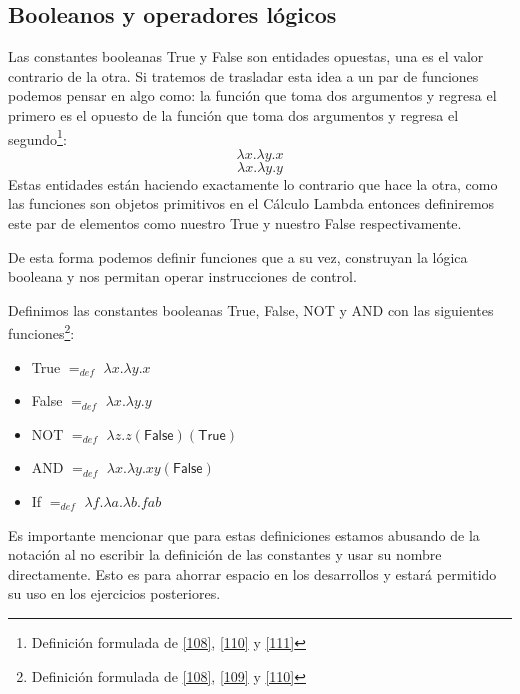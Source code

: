     \subsection{Booleanos y operadores lógicos}
    Las constantes booleanas \textsf{True} y \textsf{False} son entidades opuestas, una es el valor contrario de la otra. Si tratemos de trasladar esta idea a un par de funciones podemos pensar en algo como:
    la función que toma dos argumentos y regresa el primero es el opuesto de la función que toma dos argumentos y regresa el segundo\footnote{Definición formulada de \hyperlink{108}{[108]},  \hyperlink{110}{[110]} y  \hyperlink{111}{[111]}}:
    \[
        \lambda x.\lambda y.x
    \]
    \[
        \lambda x.\lambda y.y
    \]
    Estas entidades están haciendo exactamente lo contrario que hace la otra, como las funciones son objetos primitivos en el Cálculo Lambda entonces definiremos este par de elementos como nuestro \textsf{True} y nuestro \textsf{False} respectivamente.

    De esta forma podemos definir funciones que a su vez, construyan la lógica booleana y nos permitan operar instrucciones de control.
    \begin{definition} Definimos las constantes booleanas \textsf{True}, \textsf{False}, \textsf{NOT} y \textsf{AND} con las siguientes funciones\footnote{Definición formulada de \hyperlink{108}{[108]},  \hyperlink{109}{[109]} y  \hyperlink{110}{[110]}}:\\

        \begin{itemize}
            \item \textsf{True}  $=_{def}$  $\lambda x.\lambda y.x$ 
            \item \textsf{False}  $=_{def}$   $\lambda x.\lambda y.y$ 
            \item\textsf{NOT}   $=_{def}$   $\lambda z. z  (\textsf{False}) (\textsf{True})$ 
            \item \textsf{AND}  $=_{def}$  $\lambda x.\lambda y. xy (\textsf{False})$ 
	     \item \textsf{If}      $=_{def}$ $\lambda f.\lambda a.\lambda b.fab $
        \end{itemize}
	  \bigskip
	Es importante mencionar que para estas definiciones estamos abusando de la notación al no escribir la definición de las constantes y usar su nombre directamente. Esto es para ahorrar espacio en los desarrollos y estará permitido su uso en los ejercicios posteriores.
    \end{definition}

